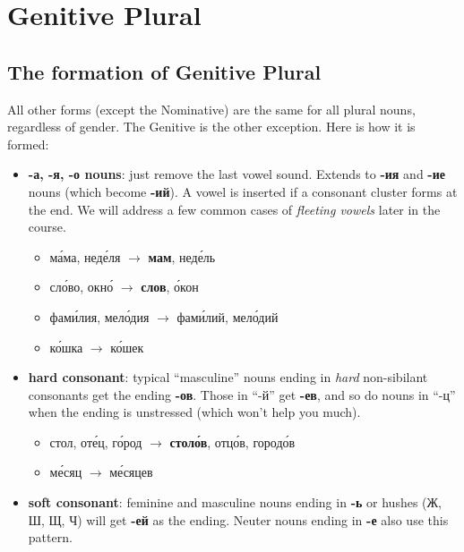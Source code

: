\chapter{Genitive Plural}\label{genitive-plural}

\section{The formation of Genitive
Plural}\label{the-formation-of-genitive-plural}

All other forms (except the Nominative) are the same for all plural
nouns, regardless of gender. The Genitive is the other exception. Here
is how it is formed:

\begin{itemize}
\item
  \textbf{-а, -я, -о nouns}: just remove the last vowel sound. Extends
  to \textbf{-ия} and \textbf{-ие} nouns (which become \textbf{-ий}). A
  vowel is inserted if a consonant cluster forms at the end. We will
  address a few common cases of \emph{fleeting vowels} later in the
  course.

  \begin{itemize}
  \tightlist
  \item
    м\'{а}ма, нед\'{е}ля $ \rightarrow$ \textbf{мам}, нед\'{е}ль
  \item
    сл\'{о}во, окн\'{о} $ \rightarrow$ \textbf{слов}, \'{о}кон
  \item
    фам\'{и}лия, мел\'{о}дия $ \rightarrow$ фам\'{и}лий, мел\'{о}дий
  \item
    к\'{о}шка $ \rightarrow$ к\'{о}шек
  \end{itemize}
\item
  \textbf{hard consonant}: typical ``masculine'' nouns ending in
  \emph{hard} non-sibilant consonants get the ending \textbf{-ов}. Those
  in ``-й'' get \textbf{-ев}, and so do nouns in ``-ц'' when the ending
  is unstressed (which won't help you much).

  \begin{itemize}
  \tightlist
  \item
    стол, от\'{е}ц, г\'{о}род $ \rightarrow$ \textbf{стол\'{о}в}, отц\'{о}в, город\'{о}в
  \item
    м\'{е}сяц $ \rightarrow$ м\'{е}сяцев
  \end{itemize}
\item
  \textbf{soft consonant}: feminine and masculine nouns ending in
  \textbf{-ь} or hushes (Ж, Ш, Щ, Ч) will get \textbf{-ей} as the
  ending. Neuter nouns ending in \textbf{-е} also use this pattern.


\end{itemize}
